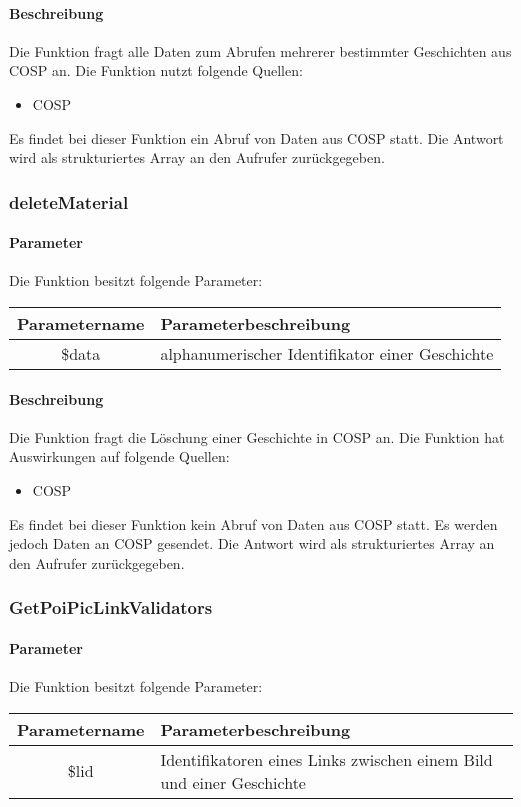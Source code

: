 \paragraph{Beschreibung} Die Funktion fragt alle Daten zum Abrufen mehrerer bestimmter Geschichten aus {\glqq COSP\grqq} an. Die Funktion nutzt folgende Quellen:
\begin{itemize}
	\item COSP
\end{itemize}
Es findet bei dieser Funktion ein Abruf von Daten aus {\glqq COSP\grqq} statt. Die Antwort wird als strukturiertes Array an den Aufrufer zurückgegeben.
\subsubsection{deleteMaterial}
\paragraph{Parameter} Die Funktion besitzt folgende Parameter:
\begin{table}[H]
	\begin{tabular}{|c|p{11cm}|}
		\hline
		\textbf{Parametername} & \textbf{Parameterbeschreibung} \\ \hline
		\$data      & alphanumerischer Identifikator einer Geschichte \\ \hline
	\end{tabular}
\end{table}
\paragraph{Beschreibung} Die Funktion fragt die Löschung einer Geschichte in {\glqq COSP\grqq} an. Die Funktion hat Auswirkungen auf folgende Quellen:
\begin{itemize}
	\item COSP
\end{itemize}
Es findet bei dieser Funktion kein Abruf von Daten aus {\glqq COSP\grqq} statt. Es werden jedoch Daten an {\glqq COSP\grqq} gesendet. Die Antwort wird als strukturiertes Array an den Aufrufer zurückgegeben.
\subsubsection{GetPoiPicLinkValidators}
\paragraph{Parameter} Die Funktion besitzt folgende Parameter:
\begin{table}[H]
	\begin{tabular}{|c|p{11cm}|}
		\hline
		\textbf{Parametername} & \textbf{Parameterbeschreibung} \\ \hline
		\$lid      & Identifikatoren eines Links zwischen einem Bild und einer Geschichte \\ \hline
	\end{tabular}
\end{table}
